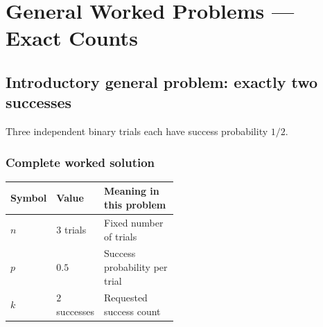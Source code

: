 \section{General Worked Problems --- Exact Counts}\label{sec:t2-c4-foundational}

\subsection{Introductory general problem: exactly two successes}\label{prob:exactly-two}
Three independent binary trials each have success probability $1/2$.


\subsubsection*{Complete worked solution}\label{sol:exactly-two}
\begin{center}
\begin{tabular}{llp{0.48\linewidth}}
\toprule
Symbol & Value & Meaning in this problem \\ \midrule
$n$ & $3$ trials & Fixed number of trials \\
$p$ & $0.5$ & Success probability per trial \\
$k$ & $2$ successes & Requested success count \\
\bottomrule
\end{tabular}
\end{center}

